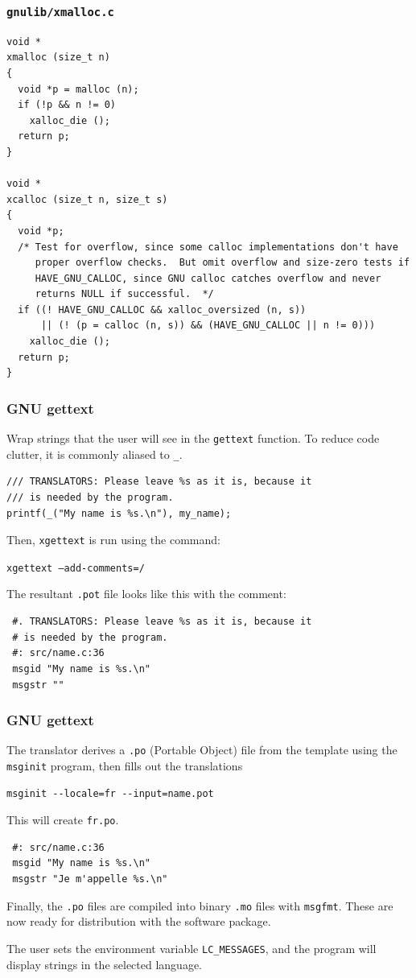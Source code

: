 \documentclass{beamer}
\begin{document}
\begin{frame}[fragile,shrink=25]
  \frametitle{\texttt{gnulib/xmalloc.c}}
\begin{verbatim}
void *
xmalloc (size_t n)
{
  void *p = malloc (n);
  if (!p && n != 0)
    xalloc_die ();
  return p;
}

void *
xcalloc (size_t n, size_t s)
{
  void *p;
  /* Test for overflow, since some calloc implementations don't have
     proper overflow checks.  But omit overflow and size-zero tests if
     HAVE_GNU_CALLOC, since GNU calloc catches overflow and never
     returns NULL if successful.  */
  if ((! HAVE_GNU_CALLOC && xalloc_oversized (n, s))
      || (! (p = calloc (n, s)) && (HAVE_GNU_CALLOC || n != 0)))
    xalloc_die ();
  return p;
}
\end{verbatim}
\end{frame}

\begin{frame}[fragile]
  \frametitle{GNU gettext}
  Wrap strings that the user will see in the \texttt{gettext} function. To reduce code
clutter, it is commonly aliased to \texttt{\_}.

\begin{verbatim}
/// TRANSLATORS: Please leave %s as it is, because it
/// is needed by the program.
printf(_("My name is %s.\n"), my_name);
\end{verbatim}

Then, \texttt{xgettext} is run using the command:

\texttt{xgettext --add-comments=/}

\vfill

The resultant \texttt{.pot} file looks like this with the comment:
\begin{verbatim}
 #. TRANSLATORS: Please leave %s as it is, because it
 # is needed by the program.
 #: src/name.c:36
 msgid "My name is %s.\n"
 msgstr ""
\end{verbatim}
\end{frame}

\begin{frame}[fragile]
  \frametitle{GNU gettext}
The translator derives a \texttt{.po} (Portable Object) file from the template
using the \texttt{msginit} program, then fills out the translations

\begin{verbatim}
msginit --locale=fr --input=name.pot
\end{verbatim}

This will create \texttt{fr.po}.

\begin{verbatim}
 #: src/name.c:36
 msgid "My name is %s.\n"
 msgstr "Je m'appelle %s.\n"
\end{verbatim}
Finally, the \texttt{.po} files are compiled into binary \texttt{.mo} files
with \texttt{msgfmt}.  These are now ready for distribution with the software
package.

The user sets the environment variable \texttt{LC\_MESSAGES}, and the program
will display strings in the selected language.
\end{frame}
\end{document}
